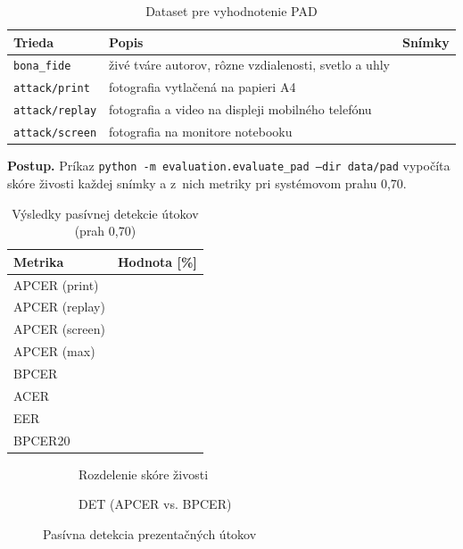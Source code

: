 \begin{table}[H]
  \centering
  \caption{Dataset pre vyhodnotenie PAD}
  \label{tab:pad-dataset}
  \begin{tabularx}{\textwidth}{@{}l X r@{}}
    \toprule
    Trieda & Popis & Snímky \\
    \midrule
    \texttt{bona\_fide} & živé tváre autorov, rôzne vzdialenosti, svetlo a uhly & \todo{} \\
    \texttt{attack/print} & fotografia vytlačená na papieri A4 & \todo{} \\
    \texttt{attack/replay} & fotografia a video na displeji mobilného telefónu & \todo{} \\
    \texttt{attack/screen} & fotografia na monitore notebooku & \todo{} \\
    \bottomrule
  \end{tabularx}
\end{table}

\textbf{Postup.} Príkaz \texttt{python -m evaluation.evaluate\_pad --dir data/pad}
vypočíta skóre živosti každej snímky a z~nich metriky pri systémovom prahu 0,70.

\begin{table}[H]
  \centering
  \caption{Výsledky pasívnej detekcie útokov (prah 0,70)}
  \label{tab:pad}
  \begin{tabular}{@{}lc@{}}
    \toprule
    Metrika & Hodnota [\%] \\
    \midrule
    APCER (print) & \todo{} \\
    APCER (replay) & \todo{} \\
    APCER (screen) & \todo{} \\
    APCER (max) & \todo{} \\
    BPCER & \todo{} \\
    ACER & \todo{} \\
    EER & \todo{} \\
    BPCER20 & \todo{} \\
    \bottomrule
  \end{tabular}
\end{table}

\begin{figure}[H]
  \centering
  \begin{subfigure}{0.49\textwidth}
    \centering
    \caption{Rozdelenie skóre živosti}
  \end{subfigure}
  \hfill
  \begin{subfigure}{0.49\textwidth}
    \centering
    \caption{DET (APCER vs. BPCER)}
  \end{subfigure}
  \caption{Pasívna detekcia prezentačných útokov}
  \label{fig:pad}
\end{figure}

